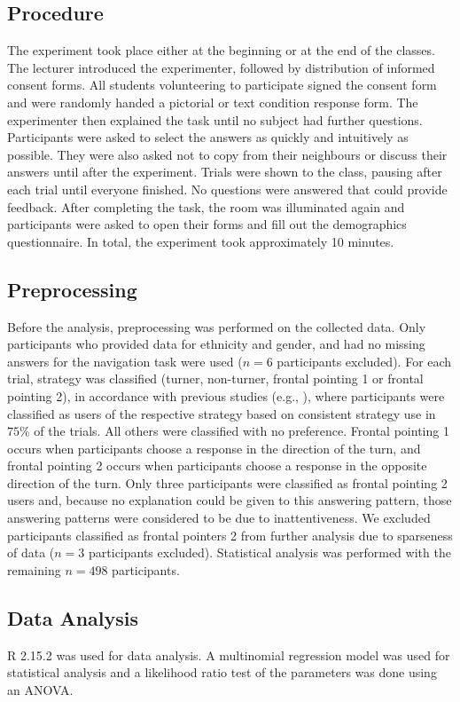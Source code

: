 \documentclass{frontiersSCNS} %
\begin{document}
\subsection{Procedure}
The experiment took place either at the beginning or at the end of the classes. The lecturer introduced the experimenter, followed by distribution of informed consent forms. All students volunteering to participate signed the consent form and were randomly handed a pictorial or text condition response form. The experimenter then explained the task until no subject had further questions. Participants were asked to select the answers as quickly and intuitively as possible. They were also asked not to copy from their neighbours or discuss their answers until after the experiment.
Trials were shown to the class, pausing after each trial until everyone finished. No questions were answered that could provide feedback.
After completing the task, the room was illuminated again and participants were asked to open their forms and fill out the demographics questionnaire. In total, the experiment took approximately 10 minutes.

\subsection{Preprocessing}
Before the analysis, preprocessing was performed on the collected data. Only participants who provided data for ethnicity and gender, and had no missing answers for the navigation task were used ($n = 6$ participants excluded). For each trial, strategy was classified (turner, non-turner, frontal pointing 1 or frontal pointing 2), in accordance with previous studies (e.g., \cite{Goeke2013}), where participants were classified as users of the respective strategy based on consistent strategy use in $75\%$ of the trials. All others were classified with no preference. Frontal pointing 1 occurs when participants choose a response in the direction of the turn, and frontal pointing 2 occurs when participants choose a response in the opposite direction of the turn. Only three participants were classified as frontal pointing 2 users and, because no explanation could be given to this answering pattern, those answering patterns were considered to be due to inattentiveness. We excluded participants classified as frontal pointers 2 from further analysis due to sparseness of data ($n = 3$ participants excluded). Statistical analysis was performed with the remaining $n = 498$ participants.

\subsection{Data Analysis}
R 2.15.2 was used for data analysis. A multinomial regression model was used for statistical analysis and a likelihood ratio test of the parameters was done using an ANOVA.
\end{document}
